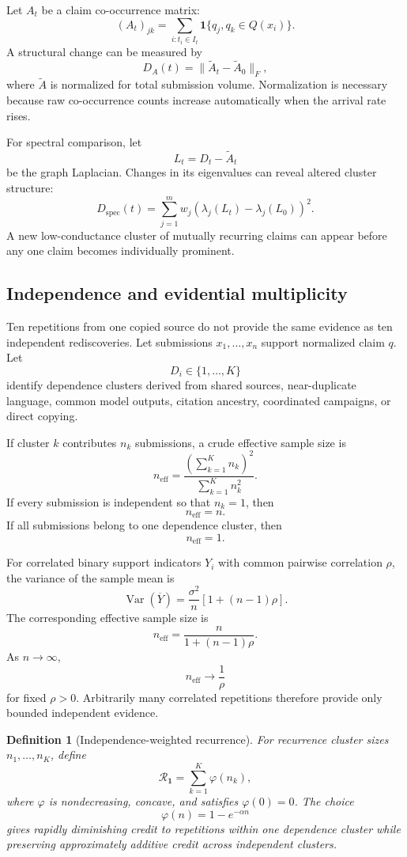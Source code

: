 \documentclass[11pt]{article}
\newtheorem{definition}{Definition}[section]
\theoremstyle{definition}
\DeclareMathOperator{\Var}{Var}
\newcommand{\ind}{\mathbf{1}}
\begin{document}
Let \(A_t\) be a claim co-occurrence matrix:
\[
(A_t)_{jk}
=
\sum_{i:t_i\in I_t}
\ind\{q_j,q_k\in Q(x_i)\}.
\]
A structural change can be measured by
\[
D_A(t)
=
\lVert
\widetilde A_t-\widetilde A_0
\rVert_F,
\]
where \(\widetilde A\) is normalized for total submission volume. Normalization is necessary because raw co-occurrence counts increase automatically when the arrival rate rises.

For spectral comparison, let
\[
L_t=D_t-\widetilde A_t
\]
be the graph Laplacian. Changes in its eigenvalues can reveal altered cluster structure:
\[
D_{\mathrm{spec}}(t)
=
\sum_{j=1}^{m}
w_j
\left(
\lambda_j(L_t)-\lambda_j(L_0)
\right)^2.
\]
A new low-conductance cluster of mutually recurring claims can appear before any one claim becomes individually prominent.

\subsection{Independence and evidential multiplicity}

Ten repetitions from one copied source do not provide the same evidence as ten independent rediscoveries. Let submissions \(x_1,\ldots,x_n\) support normalized claim \(q\). Let
\[
D_i\in\{1,\ldots,K\}
\]
identify dependence clusters derived from shared sources, near-duplicate language, common model outputs, citation ancestry, coordinated campaigns, or direct copying.

If cluster \(k\) contributes \(n_k\) submissions, a crude effective sample size is
\[
n_{\mathrm{eff}}
=
\frac{
\left(\sum_{k=1}^{K}n_k\right)^2
}{
\sum_{k=1}^{K}n_k^2
}.
\]
If every submission is independent so that \(n_k=1\), then
\[
n_{\mathrm{eff}}=n.
\]
If all submissions belong to one dependence cluster, then
\[
n_{\mathrm{eff}}=1.
\]

For correlated binary support indicators \(Y_i\) with common pairwise correlation \(\rho\), the variance of the sample mean is
\[
\Var(\overline Y)
=
\frac{\sigma^2}{n}
\left[
1+(n-1)\rho
\right].
\]
The corresponding effective sample size is
\[
n_{\mathrm{eff}}
=
\frac{n}{1+(n-1)\rho}.
\]
As \(n\to\infty\),
\[
n_{\mathrm{eff}}
\to
\frac{1}{\rho}
\]
for fixed \(\rho>0\). Arbitrarily many correlated repetitions therefore provide only bounded independent evidence.

\begin{definition}[Independence-weighted recurrence]
For recurrence cluster sizes \(n_1,\ldots,n_K\), define
\[
\mathcal{R}_{\ind}
=
\sum_{k=1}^{K}
\varphi(n_k),
\]
where \(\varphi\) is nondecreasing, concave, and satisfies \(\varphi(0)=0\). The choice
\[
\varphi(n)=1-e^{-\alpha n}
\]
gives rapidly diminishing credit to repetitions within one dependence cluster while preserving approximately additive credit across independent clusters.
\end{definition}
\end{document}
